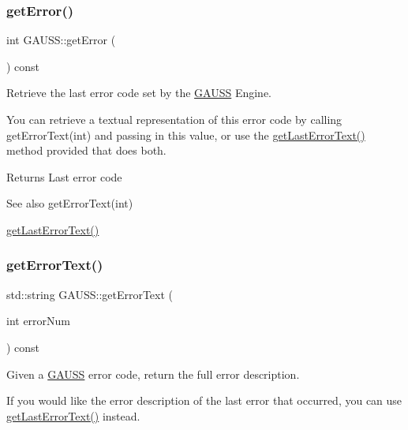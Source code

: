 \subsubsection{\texorpdfstring{get\+Error()}{getError()}}
{\footnotesize\ttfamily int G\+A\+U\+S\+S\+::get\+Error (\begin{DoxyParamCaption}{ }\end{DoxyParamCaption}) const}



Retrieve the last error code set by the \hyperlink{class_g_a_u_s_s}{G\+A\+U\+SS} Engine. 

You can retrieve a textual representation of this error code by calling get\+Error\+Text(int) and passing in this value, or use the \hyperlink{class_g_a_u_s_s_a4d8c56b05b0878aa3831ba465c409235}{get\+Last\+Error\+Text()} method provided that does both.

\begin{DoxyReturn}{Returns}
Last error code
\end{DoxyReturn}
\begin{DoxySeeAlso}{See also}
get\+Error\+Text(int) 

\hyperlink{class_g_a_u_s_s_a4d8c56b05b0878aa3831ba465c409235}{get\+Last\+Error\+Text()} 
\end{DoxySeeAlso}
\mbox{\label{class_g_a_u_s_s_a77ce9d6be867f5a1dbf62ae7ddc5dcaf}} 
\subsubsection{\texorpdfstring{get\+Error\+Text()}{getErrorText()}}
{\footnotesize\ttfamily std\+::string G\+A\+U\+S\+S\+::get\+Error\+Text (\begin{DoxyParamCaption}\item[{int}]{error\+Num }\end{DoxyParamCaption}) const}



Given a \hyperlink{class_g_a_u_s_s}{G\+A\+U\+SS} error code, return the full error description. 

If you would like the error description of the last error that occurred, you can use \hyperlink{class_g_a_u_s_s_a4d8c56b05b0878aa3831ba465c409235}{get\+Last\+Error\+Text()} instead.


